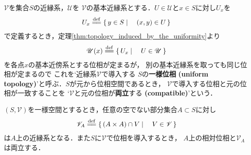 	\begin{screen}
		\begin{dfn}[一様位相]
			$\mathscr{V}$を集合$S$の近縁系，$\mathscr{U}$を
			$\mathscr{V}$の基本近縁系とする．$U \in \mathscr{U}$と$x \in S$に対し$U_x$を
			\begin{align}
				U_x \defeq \Set{y \in S}{(x,y) \in U}
			\end{align}
			で定義するとき，定理\ref{thm:topology_induced_by_the_uniformity}より
			\begin{align}
				\mathscr{U}(x) \defeq \Set{U_x}{U \in \mathscr{U}}
			\end{align}
			を各点$x$の基本近傍系とする位相が定まるが，
			別の基本近縁系を取っても同じ位相が定まるので
			これを`近縁系$\mathscr{V}$で導入する
			$S$の{\bf 一様位相}
			{\bf (uniform topology)}'と呼ぶ．$S$が元から位相空間であるとき，
			$\mathscr{V}$で導入する位相と元の位相が一致することを
			`$\mathscr{V}$と元の位相が{\bf 両立}する
			{\bf (compatible)}'という．
		\end{dfn}
	\end{screen}
	
	\begin{screen}
		\begin{thm}[部分一様空間]
			$(S,\mathscr{V})$を一様空間とするとき，任意の空でない部分集合$A \subset S$に対し
			\begin{align}
				\mathscr{V}_A \defeq 
				\Set{(A \times A) \cap V}{V \in \mathscr{V}}
			\end{align}
			は$A$上の近縁系となる．また$S$に$\mathscr{V}$で位相を導入するとき，
			$A$上の相対位相と$\mathscr{V}_A$は両立する．
		\end{thm}
	\end{screen}
	
